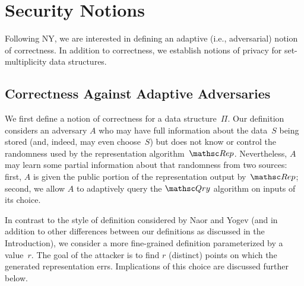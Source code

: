
\section{Security Notions}
\label{sec:security-notions}
Following NY, we are interested in defining an adaptive (i.e.,
adversarial) notion of correctness.
In addition to correctness, we establish notions of privacy for
set-multiplicity data structures.





\subsection{Correctness Against Adaptive Adversaries}


We first define a notion of correctness for a data structure~$\Pi$. Our definition
considers an adversary $A$ who may have full information about the data~$S$ being stored (and, indeed,
may even choose~$S$) but does not know or control the randomness used by the representation
algorithm~$\Rep$. Nevertheless, $A$ may learn some partial information about that randomness from
two sources: first, $A$ is given the public portion of the representation output
by~$\Rep$; second, we allow $A$ to adaptively query the $\Qry$ algorithm on inputs
of its choice.

In contrast to the style of definition considered by Naor and Yogev (and in addition
to other differences between our definitions as discussed in the Introduction), we consider
a more fine-grained definition parameterized by a value~$r$. The goal of the attacker
is to find $r$ (distinct) points on which the generated representation errs.
Implications of this choice are discussed further below.

